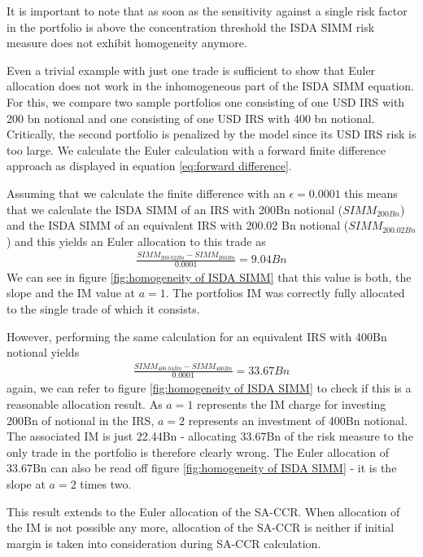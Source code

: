\documentclass[../Thesis_AHoecherl.tex]{subfiles}
\begin{document}
    It is important to note that as soon as the sensitivity against a single risk factor in the portfolio is above the concentration threshold the \gls{ISDA SIMM} risk measure does not exhibit homogeneity anymore.
    
    Even a trivial example with just one trade is sufficient to show that Euler allocation does not work in the inhomogeneous part of the \gls{ISDA SIMM} equation.
    For this, we compare two sample portfolios one consisting of one USD \gls{IRS} with 200 bn notional and one consisting of one USD \gls{IRS} with 400 bn notional.
    Critically, the second portfolio is penalized by the model since its USD \gls{IRS} risk is too large. We calculate the Euler calculation with a forward finite difference approach as displayed in equation \ref{eq:forward difference}.
    
    Assuming that we calculate the finite difference with an $\epsilon = 0.0001$ this means that we calculate the \gls{ISDA SIMM} of an \gls{IRS} with 200Bn notional ($SIMM_{200Bn}$) and the \gls{ISDA SIMM} of an equivalent \gls{IRS} with 200.02 Bn notional ($SIMM_{200.02Bn}$) and this yields an Euler allocation to this trade as
    \begin{align*}
        \frac{SIMM_{200.02Bn} - SIMM_{200Bn}}{0.0001} = 9.04Bn
    \end{align*}
    We can see in figure \ref{fig:homogeneity of ISDA SIMM} that this value is both, the slope and the \gls{IM} value at $a = 1$. The portfolios \gls{IM} was correctly fully allocated to the single trade of which it consists. 
    
    However, performing the same calculation for an equivalent \gls{IRS} with 400Bn notional yields
    \begin{align*}
        \frac{SIMM_{400.04Bn} - SIMM_{400Bn}}{0.0001} = 33.67Bn
    \end{align*}
    again, we can refer to figure \ref{fig:homogeneity of ISDA SIMM} to check if this is a reasonable allocation result. As $a=1$ represents the \gls{IM} charge for investing 200Bn of notional in the \gls{IRS}, $a=2$ represents an investment of 400Bn notional. The associated \gls{IM} is just 22.44Bn - allocating 33.67Bn of the risk measure to the only trade in the portfolio is therefore clearly wrong. The Euler allocation of 33.67Bn can also be read off figure \ref{fig:homogeneity of ISDA SIMM} - it is the slope at $a=2$ times two.

    This result extends to the Euler allocation of the \gls{SA-CCR}. When allocation of the \gls{IM} is not possible any more, allocation of the \gls{SA-CCR} is neither if initial margin is taken into consideration during \gls{SA-CCR} calculation.
\end{document}
